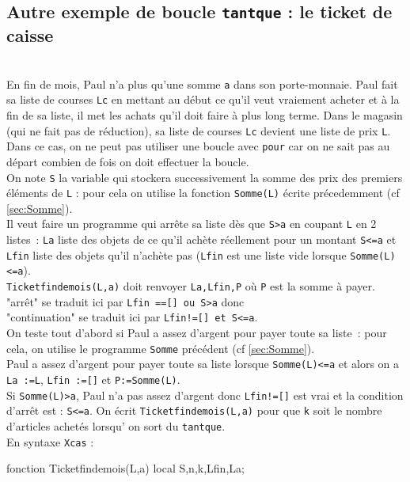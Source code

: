 \documentclass[12pt,a4paper]{book}
\begin{document}
\begin{giacjshere}
\section{Autre exemple de boucle {\tt tantque} : le ticket de caisse}\\
En fin de mois, Paul n'a plus qu'une somme {\tt a} dans son porte-monnaie.
Paul fait sa liste de courses {\tt Lc} en mettant au d\'ebut ce qu'il 
veut vraiement acheter et \`a la fin de sa liste, il met les achats qu'il doit 
faire \`a plus long terme. Dans le magasin (qui ne fait pas de r\'eduction), sa
liste de courses {\tt Lc} devient une liste de prix {\tt L}.\\
Dans ce cas, on ne peut pas utiliser une boucle avec {\tt pour} car on ne 
sait pas au d\'epart combien de fois on doit effectuer la boucle.\\
On note {\tt S} la variable qui stockera successivement la somme des prix des 
premiers \'el\'ements de  {\tt L} : pour cela on utilise la fonction 
{\tt Somme(L)} \'ecrite pr\'ecedemment (cf \ref{sec:Somme}).\\
Il veut faire un programme qui arr\^ete sa liste d\`es que {\tt S>a} en coupant 
{\tt L} en 2 listes~:
{\tt La} liste des objets de ce qu'il ach\`ete r\'eellement pour un montant 
{\tt S<=a}  et {\tt Lfin} liste des objets qu'il n'ach\`ete pas ({\tt Lfin} est 
une liste vide lorsque  {\tt Somme(L)<=a}).\\
{\tt Ticketfindemois(L,a)} doit renvoyer {\tt La,Lfin,P} o\`u {\tt P} est la 
somme \`a payer.\\
"arr\^et" se traduit ici par {\tt Lfin ==[] ou S>a} donc\\
"continuation" se traduit ici par {\tt Lfin!=[] et S<=a}.\\
On teste tout d'abord si Paul a assez d'argent pour payer toute sa liste~:
pour cela, on utilise le programme {\tt Somme} pr\'ec\'edent 
(cf \ref{sec:Somme}).\\
Paul a assez d'argent pour payer toute sa liste lorsque {\tt Somme(L)<=a} 
et alors on a {\tt La :=L}, {\tt Lfin :=[]} et {\tt P:=Somme(L)}.\\
Si {\tt Somme(L)>a}, Paul n'a pas assez d'argent donc {\tt Lfin!=[]} est 
vrai et la condition d'arr\^et  est : {\tt S<=a}.
On \'ecrit {\tt Ticketfindemois(L,a)} pour que {\tt k} soit le 
nombre d'articles achet\'es lorsqu' on sort du {\tt tantque}.\\
En syntaxe {\tt Xcas} :
\begin{giaconload}
fonction Ticketfindemois(L,a) 
 local S,n,k,Lfin,La;

\end{giaconload}
\end{giacjshere}
\end{document}
